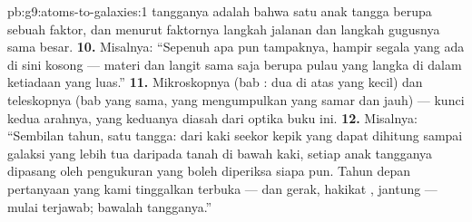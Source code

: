 \begin{solution}{pb:g9:atoms-to-galaxies:1}
tangganya adalah bahwa satu anak tangga berupa sebuah faktor, dan
menurut faktornya langkah jalanan dan langkah gugusnya sama besar.
\textbf{10.} Misalnya: ``Sepenuh apa pun tampaknya, hampir segala yang
ada di sini kosong --- materi dan langit sama saja berupa pulau yang
langka di dalam ketiadaan yang luas.''
\textbf{11.} Mikroskopnya (bab : dua  di atas
yang kecil) dan teleskopnya (bab yang sama, yang mengumpulkan yang
samar dan jauh) --- kunci kedua arahnya, yang keduanya diasah dari
optika buku ini.
\textbf{12.} Misalnya: ``Sembilan tahun, satu tangga: dari kaki seekor
kepik yang dapat dihitung sampai galaksi yang lebih tua daripada tanah
di bawah kaki, setiap anak tangganya dipasang oleh pengukuran yang
boleh diperiksa siapa pun. Tahun depan pertanyaan yang kami tinggalkan
terbuka ---  dan gerak, hakikat , jantung  --- mulai
terjawab; bawalah tangganya.''
\end{solution}

